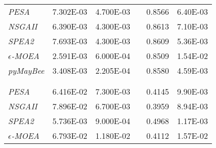 \begin{table}
\begin{tabular}{L{4cm} c c c c c}
  \addlinespace[\defaultaddspace]
                                                                                \\
  \midrule
  \textit{PESA}            & \num{7.302E-03} & \num{4.700E-03} & & \num{0.8566} & \num{6.40E-03} \\
  \textit{NSGAII}          & \num{6.390E-03} & \num{4.300E-03} & &  \num{0.8613} & \num{7.10E-03} \\
  \textit{SPEA2}           & \num{7.693E-03} & \num{4.300E-03} & & \num{0.8609} & \num{5.36E-03} \\
  \textit{$\epsilon$-MOEA} &  \num{2.591E-03} & \num{6.000E-04} & & \num{0.8509} & \num{1.54E-02} \\
  \textit{pyMayBee}        & \num{3.408E-03} &  \num{2.205E-04} & & \num{0.8580} &  \num{4.59E-03} \\
  \\
  \addlinespace[\defaultaddspace]
                                                                                \\
  \midrule
  \textit{PESA}            & \num{6.416E-02} & \num{7.300E-03} & & \num{0.4145} & \num{9.90E-03} \\
  \textit{NSGAII}          & \num{7.896E-02} & \num{6.700E-03} & & \num{0.3959} & \num{8.94E-03} \\
  \textit{SPEA2}           &  \num{5.736E-03} & \num{9.000E-04} & &  \num{0.4968} & \num{1.17E-03} \\
  \textit{$\epsilon$-MOEA} & \num{6.793E-02} & \num{1.180E-02} & & \num{0.4112} & \num{1.57E-02} \\

\end{tabular}
\end{table}
